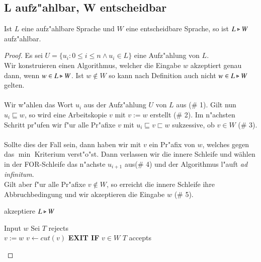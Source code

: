 \subsection{L aufz"ahlbar, W entscheidbar}
\begin{satz}
Ist $L$ eine aufz"ahlbare Sprache und $W$ eine entscheidbare Sprache, so ist $L\triangleright W$ aufz"ahlbar.
\end{satz}
\begin{proof}
Es sei $U=\{u_i : 0 \le i \le n \wedge u_i \in L\}$ eine Aufz"ahlung von $L$.\\
Wir konstruieren einen Algorithmus, welcher die Eingabe $w$ akzeptiert genau dann, wenn $w\in L\triangleright W$.
Ist $w\notin W$ so kann nach Definition auch nicht $w\in L\triangleright W$ gelten. \\\\Wir w"ahlen das Wort $u_i$ aus der Aufz"ahlung $U$ von $L$ aus (\# 1).
Gilt nun $u_i\sqsubseteq w$, so wird eine Arbeitskopie $v$ mit $v:=w$ erstellt (\# 2). Im n"achsten Schritt pr"ufen wir f"ur alle Pr"afixe $v$ mit $u_i\sqsubseteq v\sqsubset w$ sukzessive, ob $v\in W$ (\# 3). 
\\\\Sollte dies der Fall sein, dann haben wir mit $v$ ein Pr"afix von $w$, welches gegen das $\min$ Kriterium verst"o"st. Dann verlassen wir die innere Schleife und wählen in der FOR-Schleife das n"achste $u_{i+1}$ aus(\# 4) und der Algorithmus l"auft \emph{ad infinitum}.%
\\Gilt aber f"ur alle Pr"afixe $v\notin W$, so erreicht die innere Schleife ihre Abbruchbedingung und wir akzeptieren die Eingabe $w$ (\# 5).


\begin{algorithm}
\caption{akzeptiere $L\triangleright W$}
\label{split2}
\begin{algorithmic}
\STATE Input $w$
\STATE Sei
\STATE $T$ rejects
\ENDIF\\
\STATE $v := w$ 
\STATE $v \leftarrow cut(v)$ 
\STATE \textbf{EXIT IF} $v\in W$ 
\ENDWHILE
{}
\STATE $T$ accepts 
\ENDIF
\ENDIF
\ENDFOR

\end{algorithmic}
\end{algorithm}
\end{proof}
\newpage

